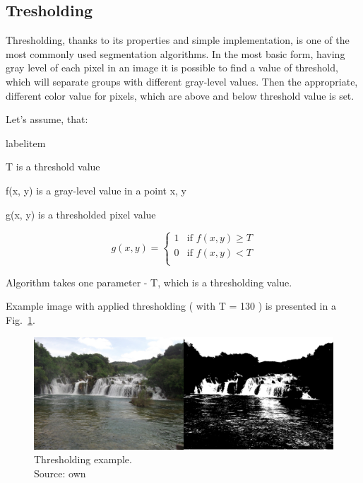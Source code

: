 \documentclass[a4paper,onecolumn,oneside,12pt]{memoir}
\makeatletter
\renewenvironment{itemize}{
  \begin{list}{  
  \csname labelitem\romannumeral\the\@listdepth\endcsname}{
  \setlength{\leftmargin}{1em}
	\setlength{\topsep}{6pt}%
	\setlength{\partopsep}{0pt}%
	\setlength{\parskip}{0pt}%
	\setlength{\parsep}{0pt}%
	\setlength{\itemsep}{0pt}}
}{
  \end{list}
}
\makeatother
\begin{document}
\subsection{Tresholding}

Thresholding, thanks to its properties and simple implementation, is one of the most commonly used
segmentation algorithms. In the most basic form, having gray level of each pixel in an image it is
possible to find a value of threshold, which will separate groups with different gray-level values.
Then the appropriate, different color value for pixels, which are above and below threshold value
is set.

Let's assume, that:
\begin{itemize}
  \item T is a threshold value
  \item f(x, y) is a gray-level value in a point x, y
  \item g(x, y) is a thresholded pixel value
\end{itemize}

$$
g(x, y) = \left\{ \begin{array}{ll}
1 & \textrm{if $f(x, y) \geq T$}\\
0 & \textrm{if $f(x, y) < T$}\\
\end{array} \right.
$$

Algorithm takes one parameter - T, which is a thresholding value.

Example image with applied thresholding ( with T = 130 ) is presented in a 
Fig.~\ref{thresholdingExample}.

\begin{figure}[ht]
\begin{center}
\includegraphics[scale=0.15]{images/thresholdingExample.jpg}
\caption{Thresholding example. \\
Source: own}
\label{thresholdingExample}
\end{center}
\end{figure}
\end{document}
